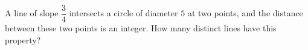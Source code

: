A line of slope $\dfrac{3}{4}$ intersects a circle of diameter $5$ at two points, and the distance between these two points is an integer. How many distinct lines have this property?
